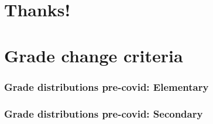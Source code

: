 \documentclass{beamer}
\begin{document}
\section{Thanks!}






\section{Grade change criteria}

\begin{frame}
    \label{update_scott}
    \frametitle{Grade distributions pre-covid: Elementary}
 {
    }
\end{frame}

\begin{frame}
    \label{update_scott}
    \frametitle{Grade distributions pre-covid: Secondary}
 {
    }
\end{frame}
\end{document}
